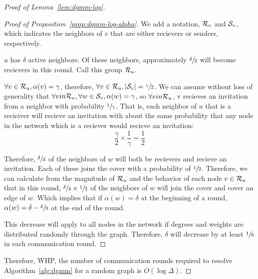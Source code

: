\begin{proof}[Proof of Lemma~\ref{lem:dgmm-log}]
\begin{proof}[Proof of Proposition~\ref{prop:dgmm-log-alpha}]
We add a notation, ${\mathcal R}_v$ and ${\mathcal S}_v$, which indicates the neighbors of $v$ that are either recievers or senders, respectively.

$u$ has $\delta$ active neighbors. Of these neighbors, approximately $\sfrac{\delta}{2}$ will become recievers in this round. Call this group ${\mathcal R}_u$. 

$\forall v \in {\mathcal R}_u, \alpha(v) = \gamma$, therefore, $\forall v \in {\mathcal R}_u, |{\mathcal S}_v| = \sfrac{\gamma}{2}$. We can assume without loss of generality that $\forall v in {\mathcal R}_u, \forall w \in {\mathcal S}_v, \alpha(w) = \gamma$, so $\forall v in {\mathcal R}_u$, v recieves an invitation from a neighbor with probability $\sfrac{1}{\gamma}$. That is, each neighbor of $u$ that is a recieiver will recieve an invitation with about the same probability that any node in the network which is a reciever would recieve an invitation:\begin{equation*}\frac{\gamma}{2} \times \frac{1}{\gamma} = \frac{1}{2}\end{equation*}

Therefore, $\sfrac{\delta}{4}$ of the neighbors of $w$ will both be recievers and recieve an invitation. Each of these joins the cover with a probability of $\sfrac{1}{2}$. Therefore, we can calculate from the magnitude of ${\mathcal R}_u$ and the behavior of each node $v \in {\mathcal R}_u$ that in this round, $\sfrac{\delta}{4}\times \sfrac{1}{2}$ of the neighbors of $w$ will join the cover and cover an edge of $w$. Which implies that if $\alpha(w) = \delta$ at the beginning of a round, $\alpha(w) = \delta-\sfrac{\delta}{8}$ at the end of the round.

This decrease will apply to all nodes in the network if degrees and weights are distributed randomly through the graph. Therefore, $\delta$ will decrease by at least $\sfrac{1}{8}$ in each communication round. 
\end{proof}

Therefore, WHP, the number of communication rounds required to resolve Algorithm~\ref{alg:dgmm} for a random graph is $O(\log\Delta)$.

\end{proof} 
